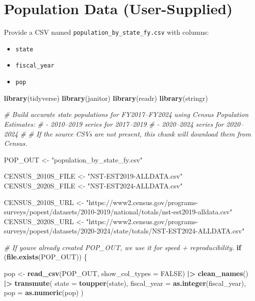 \documentclass[
  11pt,
]{article}
\newenvironment{Shaded}{\begin{snugshade}}{\end{snugshade}}
\newcommand{\AttributeTok}[1]{\textcolor[rgb]{0.13,0.29,0.53}{#1}}
\newcommand{\CommentTok}[1]{\textcolor[rgb]{0.56,0.35,0.01}{\textit{#1}}}
\newcommand{\ConstantTok}[1]{\textcolor[rgb]{0.56,0.35,0.01}{#1}}
\newcommand{\ControlFlowTok}[1]{\textcolor[rgb]{0.13,0.29,0.53}{\textbf{#1}}}
\newcommand{\FunctionTok}[1]{\textcolor[rgb]{0.13,0.29,0.53}{\textbf{#1}}}
\newcommand{\NormalTok}[1]{#1}
\newcommand{\OtherTok}[1]{\textcolor[rgb]{0.56,0.35,0.01}{#1}}
\newcommand{\SpecialCharTok}[1]{\textcolor[rgb]{0.81,0.36,0.00}{\textbf{#1}}}
\newcommand{\StringTok}[1]{\textcolor[rgb]{0.31,0.60,0.02}{#1}}
\providecommand{\tightlist}{%
  \setlength{\itemsep}{0pt}\setlength{\parskip}{0pt}}
\begin{document}
\section{Population Data
(User-Supplied)}\label{population-data-user-supplied}

Provide a CSV named \texttt{population\_by\_state\_fy.csv} with columns:

\begin{itemize}
\tightlist
\item
  \texttt{state}
\item
  \texttt{fiscal\_year}
\item
  \texttt{pop}
\end{itemize}

\begin{Shaded}
\begin{Highlighting}[]
\FunctionTok{library}\NormalTok{(tidyverse)}
\FunctionTok{library}\NormalTok{(janitor)}
\FunctionTok{library}\NormalTok{(readr)}
\FunctionTok{library}\NormalTok{(stringr)}

\CommentTok{\# Build accurate state populations for FY2017–FY2024 using Census Population Estimates:}
\CommentTok{\# {-} 2010–2019 series for 2017–2019}
\CommentTok{\# {-} 2020–2024 series for 2020–2024}
\CommentTok{\#}
\CommentTok{\# If the source CSVs are not present, this chunk will download them from Census.}

\NormalTok{POP\_OUT }\OtherTok{\textless{}{-}} \StringTok{"population\_by\_state\_fy.csv"}

\NormalTok{CENSUS\_2010S\_FILE }\OtherTok{\textless{}{-}} \StringTok{"NST{-}EST2019{-}ALLDATA.csv"}
\NormalTok{CENSUS\_2020S\_FILE }\OtherTok{\textless{}{-}} \StringTok{"NST{-}EST2024{-}ALLDATA.csv"}

\NormalTok{CENSUS\_2010S\_URL }\OtherTok{\textless{}{-}} \StringTok{"https://www2.census.gov/programs{-}surveys/popest/datasets/2010{-}2019/national/totals/nst{-}est2019{-}alldata.csv"}
\NormalTok{CENSUS\_2020S\_URL }\OtherTok{\textless{}{-}} \StringTok{"https://www2.census.gov/programs{-}surveys/popest/datasets/2020{-}2024/state/totals/NST{-}EST2024{-}ALLDATA.csv"}

\CommentTok{\# If you\textquotesingle{}ve already created POP\_OUT, we use it for speed + reproducibility.}
\ControlFlowTok{if}\NormalTok{ (}\FunctionTok{file.exists}\NormalTok{(POP\_OUT)) \{}

\NormalTok{  pop }\OtherTok{\textless{}{-}} \FunctionTok{read\_csv}\NormalTok{(POP\_OUT, }\AttributeTok{show\_col\_types =} \ConstantTok{FALSE}\NormalTok{) }\SpecialCharTok{|\textgreater{}}
    \FunctionTok{clean\_names}\NormalTok{() }\SpecialCharTok{|\textgreater{}}
    \FunctionTok{transmute}\NormalTok{(}
      \AttributeTok{state =} \FunctionTok{toupper}\NormalTok{(state),}
      \AttributeTok{fiscal\_year =} \FunctionTok{as.integer}\NormalTok{(fiscal\_year),}
      \AttributeTok{pop =} \FunctionTok{as.numeric}\NormalTok{(pop)}
\NormalTok{    )}


\end{Highlighting}
\end{Shaded}
\end{document}

